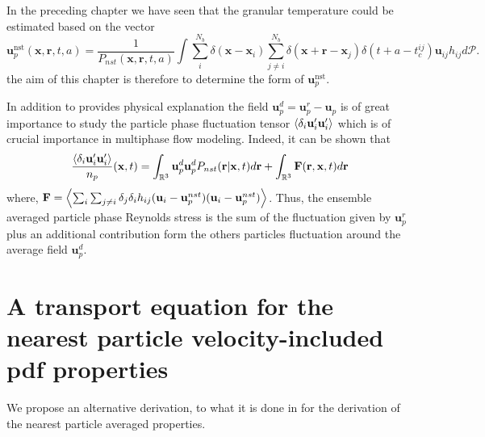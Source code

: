 In the preceding chapter we have seen that the granular temperature could be estimated based on the vector
\begin{equation*}
    \textbf{u}^\text{nst}_p (\textbf{x},\textbf{r},t,a)
    = 
    \frac{1}{P_{nst}(\textbf{x},\textbf{r},t,a)}
    \int \sum_{i}^{N_b}\delta(\textbf{x}-\textbf{x}_i)
    \sum_{j\neq i}^{N_b}\delta(\textbf{x}+\textbf{r}-\textbf{x}_j) 
    \delta(t+a-t_c^{ij}) 
    \textbf{u}_{ij}
    h_{ij} 
    d\mathscr{P}.
    \label{eq:q_nstij}
\end{equation*}
the aim of this chapter is therefore to determine the form of $\textbf{u}^\text{nst}_p$. 

In addition to provides physical explanation the field $\textbf{u}_p^d = \textbf{u}^r_p - \textbf{u}_p$ is of great importance to study the particle phase fluctuation tensor $\left<\delta_i \textbf{u}_i' \textbf{u}_i'\right>$ which is of crucial importance in multiphase flow modeling. 
Indeed, it can be shown that 
\begin{equation*}
    \frac{\left<\delta_i \textbf{u}_i' \textbf{u}_i'\right>}{n_p}(\textbf{x},t)
    =  
    \int_{\mathbb{R}^3 }
    \textbf{u}_p^d
    \textbf{u}_p^d
    P_{nst}(\textbf{r}|\textbf{x},t)
    d\textbf{r}
    + \int_{\mathbb{R}^3 }
    \textbf{F}(\textbf{r},\textbf{x},t)
    d\textbf{r}
\end{equation*}
where, $\textbf{F} = \left<\sum_i\sum_{j\neq i}\delta_j\delta_i h_{ij}(\textbf{u}_i - \textbf{u}_p^{nst})(\textbf{u}_i - \textbf{u}_p^{nst})\right>$. 
Thus, the ensemble averaged particle phase Reynolds stress is the sum of the fluctuation given by $\textbf{u}_p^r$ plus an additional contribution form the others particles fluctuation around the average field $\textbf{u}_p^d$. 


\section{A transport equation for the nearest particle velocity-included pdf properties}

We propose an alternative derivation, to what it is done in \citet{zhang2023evolution} for the derivation of the nearest particle averaged properties. 



